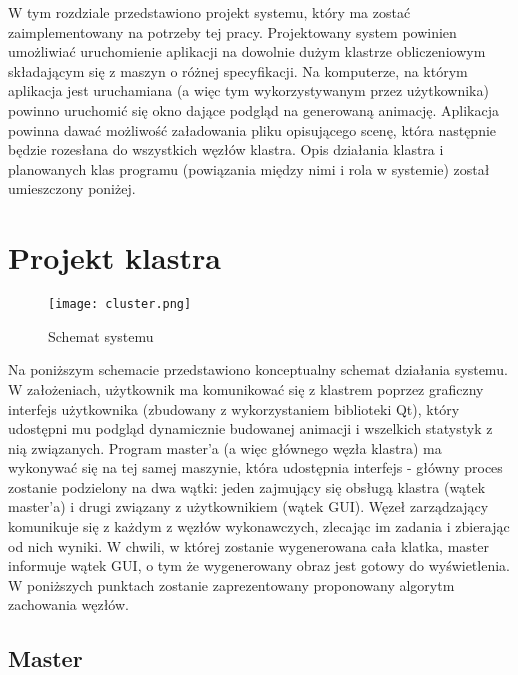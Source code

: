 W tym rozdziale przedstawiono projekt systemu, który ma zostać zaimplementowany na potrzeby tej pracy. Projektowany system powinien umożliwiać uruchomienie aplikacji na dowolnie dużym klastrze obliczeniowym składającym się z maszyn o różnej specyfikacji. Na komputerze, na którym aplikacja jest uruchamiana (a więc tym wykorzystywanym przez użytkownika) powinno uruchomić się okno dające podgląd na generowaną animację. Aplikacja powinna dawać możliwość załadowania pliku opisującego scenę, która następnie będzie rozesłana do wszystkich węzłów klastra. Opis działania klastra i planowanych klas programu (powiązania między nimi i rola w systemie) został umieszczony poniżej. 

\section{Projekt klastra}

\begin{figure}[h!]
\centering
  \caption{Schemat systemu}
  \texttt{[image: cluster.png]}
\end{figure}

Na poniższym schemacie przedstawiono konceptualny schemat działania systemu. W założeniach, użytkownik ma komunikować się z klastrem poprzez graficzny interfejs użytkownika (zbudowany z wykorzystaniem biblioteki Qt), który udostępni mu podgląd dynamicznie budowanej animacji i wszelkich statystyk z nią związanych. Program master'a (a więc głównego węzła klastra) ma wykonywać się na tej samej maszynie, która udostępnia interfejs - główny proces zostanie podzielony na dwa wątki: jeden zajmujący się obsługą klastra (wątek master'a) i drugi związany z użytkownikiem (wątek GUI). Węzeł zarządzający komunikuje się z każdym z węzłów wykonawczych, zlecając im zadania i zbierając od nich wyniki. W chwili, w której zostanie wygenerowana cała klatka, master informuje wątek GUI, o tym że wygenerowany obraz jest gotowy do wyświetlenia. W poniższych punktach zostanie zaprezentowany proponowany algorytm zachowania węzłów.  
	
\subsection{Master}

